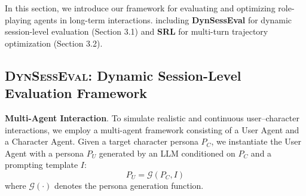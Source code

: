 In this section, we introduce our framework for evaluating and optimizing role-playing agents in long-term interactions.  including \textbf{DynSessEval} for dynamic session-level evaluation (Section 3.1) and \textbf{SRL} for multi-turn trajectory optimization (Section 3.2).


\subsection{ \textsc{DynSessEval}: Dynamic Session-Level Evaluation Framework}


\textbf{Multi-Agent Interaction}. To simulate realistic and continuous user--character interactions, we employ a multi-agent framework consisting of a User Agent and a Character Agent. Given a target character persona $P_C$, we instantiate the User Agent with a persona $P_U$ generated by an LLM conditioned on $P_C$ and a prompting template $I$:
\begin{equation}
P_U = \mathcal{G}(P_C, I)
\end{equation}
where $\mathcal{G}(\cdot)$ denotes the persona generation function.



